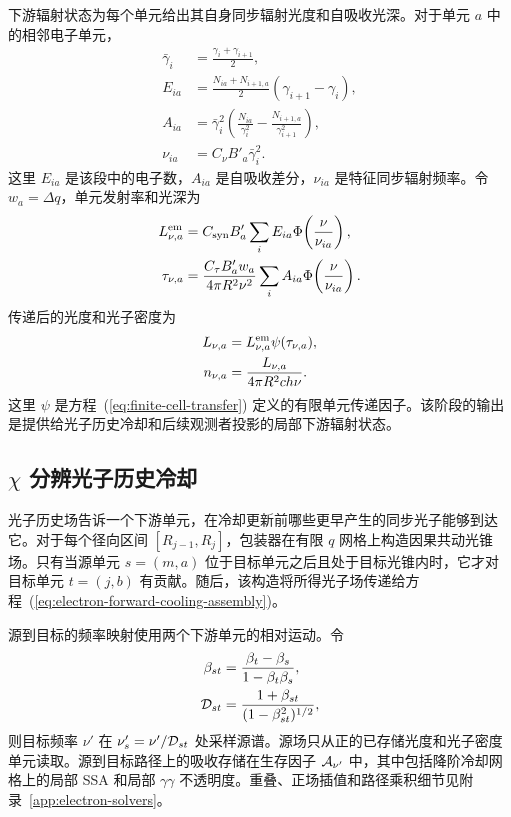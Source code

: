 \documentclass[twocolumn]{aastex702}
\begin{document}
下游辐射状态为每个单元给出其自身同步辐射光度和自吸收光深。对于单元 \(a\) 中的相邻电子单元，
\begin{equation}
\begin{aligned}
\bar\gamma_i&=\frac{\gamma_i+\gamma_{i+1}}{2},\\
E_{ia}&=\frac{N_{ia}+N_{i+1,a}}{2}(\gamma_{i+1}-\gamma_i),\\
A_{ia}&=\bar\gamma_i^2
\left(\frac{N_{ia}}{\gamma_i^2}
-\frac{N_{i+1,a}}{\gamma_{i+1}^2}\right),\\
\nu_{ia}&=C_\nu B'_a\bar\gamma_i^2 .
\end{aligned}
\end{equation}
这里 \(E_{ia}\) 是该段中的电子数，\(A_{ia}\) 是自吸收差分，\(\nu_{ia}\) 是特征同步辐射频率。令 \(w_a=\Delta q\)，单元发射率和光深为
\begin{equation}
\begin{aligned}
L_{\nu,a}^{\rm em}&=C_{\rm syn}B'_a
\sum_iE_{ia}\Phi\!\left(\frac{\nu}{\nu_{ia}}\right),\\
\tau_{\nu,a}&=
\frac{C_\tau B'_a w_a}{4\pi R^2\nu^2}
\sum_iA_{ia}\Phi\!\left(\frac{\nu}{\nu_{ia}}\right).
\end{aligned}
\end{equation}
传递后的光度和光子密度为
\begin{equation}
\begin{aligned}
L_{\nu,a}&=L_{\nu,a}^{\rm em}\psi(\tau_{\nu,a}),\\
n_{\nu,a}&=\frac{L_{\nu,a}}{4\pi R^2 c h\nu}.
\end{aligned}
\end{equation}
这里 \(\psi\) 是方程~(\ref{eq:finite-cell-transfer}) 定义的有限单元传递因子。该阶段的输出是提供给光子历史冷却和后续观测者投影的局部下游辐射状态。

\subsection{\texorpdfstring{\(\chi\)}{chi} 分辨光子历史冷却}

光子历史场告诉一个下游单元，在冷却更新前哪些更早产生的同步光子能够到达它。对于每个径向区间 \([R_{j-1},R_j]\)，包装器在有限 \(q\) 网格上构造因果共动光锥场。只有当源单元 \(s=(m,a)\) 位于目标单元之后且处于目标光锥内时，它才对目标单元 \(t=(j,b)\) 有贡献。随后，该构造将所得光子场传递给方程~(\ref{eq:electron-forward-cooling-assembly})。

源到目标的频率映射使用两个下游单元的相对运动。令
\begin{equation}
\begin{aligned}
\beta_{st}&=\frac{\beta_t-\beta_s}{1-\beta_t\beta_s},\\
{\cal D}_{st}&=\frac{1+\beta_{st}}{(1-\beta_{st}^2)^{1/2}},
\end{aligned}
\end{equation}
则目标频率 \(\nu'\) 在 \(\nu'_s=\nu'/{\cal D}_{st}\) 处采样源谱。源场只从正的已存储光度和光子密度单元读取。源到目标路径上的吸收存储在生存因子 \({\cal A}_{\nu'}\) 中，其中包括降阶冷却网格上的局部 SSA 和局部 \(\gamma\gamma\) 不透明度。重叠、正场插值和路径乘积细节见附录~\ref{app:electron-solvers}。
\end{document}
